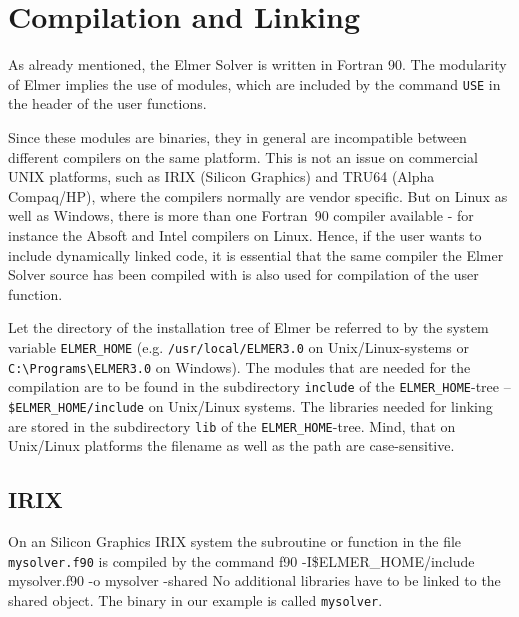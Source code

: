 \section{Compilation and Linking}
As already mentioned, the Elmer Solver is written in Fortran 90. The modularity of Elmer implies the use of modules, which are included by the command \texttt{USE} in the header of the user functions. 

Since these modules are binaries, they in general are incompatible between different compilers on the same platform. This is not an issue on commercial UNIX platforms, such as IRIX (Silicon Graphics) and TRU64 (Alpha Compaq/HP), where the compilers normally are vendor specific. But on Linux as well as Windows, there is more than one Fortran~90 compiler available - for instance the Absoft and Intel compilers on Linux. Hence, if the user wants to include dynamically linked code, it is essential that the same compiler the Elmer Solver source has been compiled with is also used for compilation of the user function.

Let the directory of the installation tree of Elmer be referred to by the system variable \texttt{ELMER\_HOME} (e.g. \texttt{/usr/local/ELMER3.0} on Unix/Linux-systems or \texttt{C:\textbackslash Programs\textbackslash ELMER3.0} on Windows). The modules that are needed for the compilation are to be found in the subdirectory \texttt{include} of the \texttt{ELMER\_HOME}-tree -- \texttt{\$ELMER\_HOME/include} on Unix/Linux systems. The libraries needed for linking are stored in the subdirectory \texttt{lib} of the \texttt{ELMER\_HOME}-tree. Mind, that on Unix/Linux platforms the filename as well as the path are case-sensitive.
\subsection{IRIX\label{programming:compile_IRIX}}
On an Silicon Graphics IRIX system  the subroutine or function in the file \texttt{mysolver.f90} is compiled by the command
\ttbegin
f90 -I\$ELMER_HOME/include mysolver.f90 -o mysolver -shared
\ttend
No additional libraries have to be linked to the shared object. The binary in our example is called \texttt{mysolver}.
